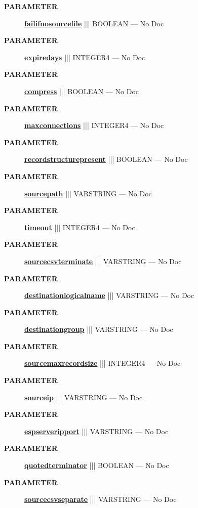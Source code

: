 \par
\begin{description}
\item [\colorbox{tagtype}{\color{white} \textbf{\textsf{PARAMETER}}}] \textbf{\underline{failifnosourcefile}} ||| BOOLEAN --- No Doc
\item [\colorbox{tagtype}{\color{white} \textbf{\textsf{PARAMETER}}}] \textbf{\underline{expiredays}} ||| INTEGER4 --- No Doc
\item [\colorbox{tagtype}{\color{white} \textbf{\textsf{PARAMETER}}}] \textbf{\underline{compress}} ||| BOOLEAN --- No Doc
\item [\colorbox{tagtype}{\color{white} \textbf{\textsf{PARAMETER}}}] \textbf{\underline{maxconnections}} ||| INTEGER4 --- No Doc
\item [\colorbox{tagtype}{\color{white} \textbf{\textsf{PARAMETER}}}] \textbf{\underline{recordstructurepresent}} ||| BOOLEAN --- No Doc
\item [\colorbox{tagtype}{\color{white} \textbf{\textsf{PARAMETER}}}] \textbf{\underline{sourcepath}} ||| VARSTRING --- No Doc
\item [\colorbox{tagtype}{\color{white} \textbf{\textsf{PARAMETER}}}] \textbf{\underline{timeout}} ||| INTEGER4 --- No Doc
\item [\colorbox{tagtype}{\color{white} \textbf{\textsf{PARAMETER}}}] \textbf{\underline{sourcecsvterminate}} ||| VARSTRING --- No Doc
\item [\colorbox{tagtype}{\color{white} \textbf{\textsf{PARAMETER}}}] \textbf{\underline{destinationlogicalname}} ||| VARSTRING --- No Doc
\item [\colorbox{tagtype}{\color{white} \textbf{\textsf{PARAMETER}}}] \textbf{\underline{destinationgroup}} ||| VARSTRING --- No Doc
\item [\colorbox{tagtype}{\color{white} \textbf{\textsf{PARAMETER}}}] \textbf{\underline{sourcemaxrecordsize}} ||| INTEGER4 --- No Doc
\item [\colorbox{tagtype}{\color{white} \textbf{\textsf{PARAMETER}}}] \textbf{\underline{sourceip}} ||| VARSTRING --- No Doc
\item [\colorbox{tagtype}{\color{white} \textbf{\textsf{PARAMETER}}}] \textbf{\underline{espserveripport}} ||| VARSTRING --- No Doc
\item [\colorbox{tagtype}{\color{white} \textbf{\textsf{PARAMETER}}}] \textbf{\underline{quotedterminator}} ||| BOOLEAN --- No Doc
\item [\colorbox{tagtype}{\color{white} \textbf{\textsf{PARAMETER}}}] \textbf{\underline{sourcecsvseparate}} ||| VARSTRING --- No Doc

\end{description}
